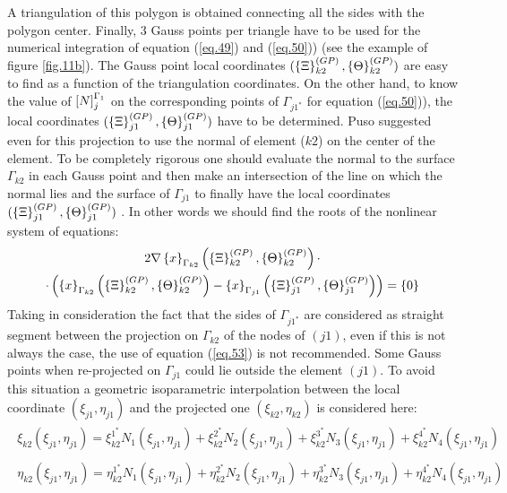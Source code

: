 A triangulation of this polygon is obtained connecting all the sides with the polygon center. Finally, 3 Gauss points per triangle have to be used for the numerical integration of equation (\ref{eq.49}) and (\ref{eq.50})) (see the example of figure \ref{fig.11b}). The Gauss point local coordinates  $(\left\lbrace{\Xi}\right \rbrace_{k2}^{(GP)},\left\lbrace{\Theta}\right \rbrace_{k2}^{(GP)})$ are easy to find as a function of the triangulation coordinates. On the other hand, to know the value of $\left[{N}\right]_{j}^{\Gamma_1}$ on the corresponding points of $\Gamma_{j1^*}$ for equation (\ref{eq.50})), the local coordinates  $(\left\lbrace{\Xi}\right \rbrace_{j1}^{(GP)},\left\lbrace{\Theta}\right \rbrace_{j1}^{(GP)})$  have to be determined. Puso suggested even for this projection to use the normal of element ($k2$) on the center of the element. To be completely rigorous one should evaluate the normal to the surface $\Gamma_{k2}$ in each Gauss point and then make an intersection of the line on which the normal lies and the surface of $\Gamma_{j1}$ to finally have the local coordinates $(\left\lbrace{\Xi}\right \rbrace_{j1}^{(GP)},\left\lbrace{\Theta}\right \rbrace_{j1}^{(GP)})$ . In other words we should find the roots of the nonlinear system of equations:
\begin{multline}
\label{eq.53}
2\nabla\left\lbrace{x}\right \rbrace_{\Gamma_{k2}}\left(\left\lbrace{\Xi}\right \rbrace_{k2}^{(GP)},\left\lbrace{\Theta}\right \rbrace_{k2}^{(GP)}\right)\cdot \\ \cdot\left( \left\lbrace{x}\right \rbrace_{\Gamma_{k2}}\left(\left\lbrace{\Xi}\right \rbrace_{k2}^{(GP)},\left\lbrace{\Theta}\right \rbrace_{k2}^{(GP)}\right)-\left\lbrace{x}\right \rbrace_{\Gamma_{j1}}\left(\left\lbrace{\Xi}\right \rbrace_{j1}^{(GP)},\left\lbrace{\Theta}\right \rbrace_{j1}^{(GP)}\right)\right)= \left\lbrace{0}\right \rbrace
\end{multline}
Taking in consideration the fact that the sides of $\Gamma_{j1^*}$ are considered as straight segment between the projection on  $\Gamma_{k2}$ of the nodes of $(j1)$, even if this is not always the case, the use of equation (\ref{eq.53}) is not recommended. Some Gauss points when re-projected on $\Gamma_{j1}$ could lie outside the element $(j1)$. To avoid this situation a geometric isoparametric interpolation between the local coordinate $(\xi_{j1},\eta_{j1})$ and the projected one $(\xi_{k2},\eta_{k2})$ is considered here:
\begin{eqnarray}
\label{eq.54}
\begin{aligned}
\xi_{k2}\left(\xi_{j1},\eta_{j1}\right)=\xi_{k2}^{1^*}N_1\left( \xi_{j1},\eta_{j1}\right)+\xi_{k2}^{2^*}N_2\left( \xi_{j1},\eta_{j1}\right)+\xi_{k2}^{3^*}N_3\left( \xi_{j1},\eta_{j1}\right)+\xi_{k2}^{4^*}N_4\left( \xi_{j1},\eta_{j1}\right)
\end{aligned} \\
\label{eq.55}
\begin{aligned}
\eta_{k2}\left(\xi_{j1},\eta_{j1}\right)=\eta_{k2}^{1^*}N_1\left( \xi_{j1},\eta_{j1}\right)+\eta_{k2}^{2^*}N_2\left( \xi_{j1},\eta_{j1}\right)+\eta_{k2}^{3^*}N_3\left( \xi_{j1},\eta_{j1}\right)+\eta_{k2}^{4^*}N_4\left( \xi_{j1},\eta_{j1}\right) 
\end{aligned} 
\end{eqnarray}
